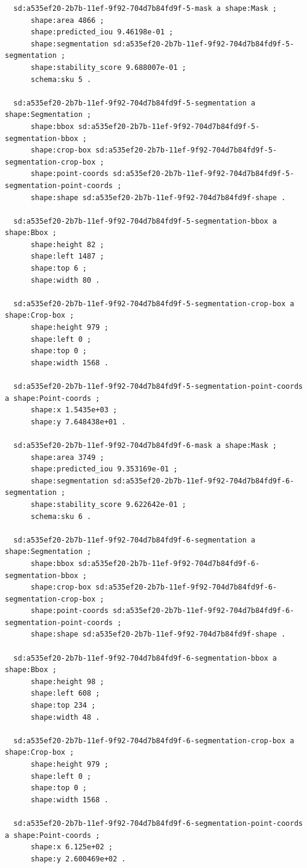 \documentclass[732,14pt,final]{studrep}
\begin{document}
\begin{verbatim}
  sd:a535ef20-2b7b-11ef-9f92-704d7b84fd9f-5-mask a shape:Mask ;
      shape:area 4866 ;
      shape:predicted_iou 9.46198e-01 ;
      shape:segmentation sd:a535ef20-2b7b-11ef-9f92-704d7b84fd9f-5-segmentation ;
      shape:stability_score 9.688007e-01 ;
      schema:sku 5 .
  
  sd:a535ef20-2b7b-11ef-9f92-704d7b84fd9f-5-segmentation a shape:Segmentation ;
      shape:bbox sd:a535ef20-2b7b-11ef-9f92-704d7b84fd9f-5-segmentation-bbox ;
      shape:crop-box sd:a535ef20-2b7b-11ef-9f92-704d7b84fd9f-5-segmentation-crop-box ;
      shape:point-coords sd:a535ef20-2b7b-11ef-9f92-704d7b84fd9f-5-segmentation-point-coords ;
      shape:shape sd:a535ef20-2b7b-11ef-9f92-704d7b84fd9f-shape .
  
  sd:a535ef20-2b7b-11ef-9f92-704d7b84fd9f-5-segmentation-bbox a shape:Bbox ;
      shape:height 82 ;
      shape:left 1487 ;
      shape:top 6 ;
      shape:width 80 .
  
  sd:a535ef20-2b7b-11ef-9f92-704d7b84fd9f-5-segmentation-crop-box a shape:Crop-box ;
      shape:height 979 ;
      shape:left 0 ;
      shape:top 0 ;
      shape:width 1568 .
  
  sd:a535ef20-2b7b-11ef-9f92-704d7b84fd9f-5-segmentation-point-coords a shape:Point-coords ;
      shape:x 1.5435e+03 ;
      shape:y 7.648438e+01 .
  
  sd:a535ef20-2b7b-11ef-9f92-704d7b84fd9f-6-mask a shape:Mask ;
      shape:area 3749 ;
      shape:predicted_iou 9.353169e-01 ;
      shape:segmentation sd:a535ef20-2b7b-11ef-9f92-704d7b84fd9f-6-segmentation ;
      shape:stability_score 9.622642e-01 ;
      schema:sku 6 .
  
  sd:a535ef20-2b7b-11ef-9f92-704d7b84fd9f-6-segmentation a shape:Segmentation ;
      shape:bbox sd:a535ef20-2b7b-11ef-9f92-704d7b84fd9f-6-segmentation-bbox ;
      shape:crop-box sd:a535ef20-2b7b-11ef-9f92-704d7b84fd9f-6-segmentation-crop-box ;
      shape:point-coords sd:a535ef20-2b7b-11ef-9f92-704d7b84fd9f-6-segmentation-point-coords ;
      shape:shape sd:a535ef20-2b7b-11ef-9f92-704d7b84fd9f-shape .
  
  sd:a535ef20-2b7b-11ef-9f92-704d7b84fd9f-6-segmentation-bbox a shape:Bbox ;
      shape:height 98 ;
      shape:left 608 ;
      shape:top 234 ;
      shape:width 48 .
  
  sd:a535ef20-2b7b-11ef-9f92-704d7b84fd9f-6-segmentation-crop-box a shape:Crop-box ;
      shape:height 979 ;
      shape:left 0 ;
      shape:top 0 ;
      shape:width 1568 .
  
  sd:a535ef20-2b7b-11ef-9f92-704d7b84fd9f-6-segmentation-point-coords a shape:Point-coords ;
      shape:x 6.125e+02 ;
      shape:y 2.600469e+02 .
  

\end{verbatim}
\end{document}
